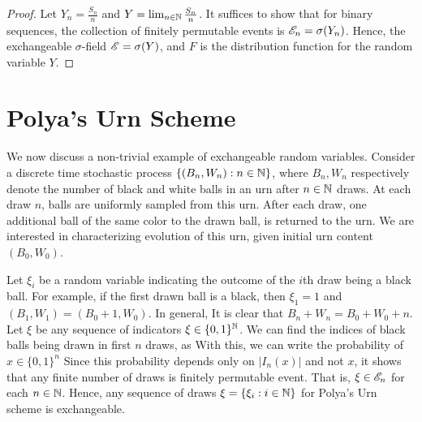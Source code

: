 \documentclass[a4paper,english,10pt]{article}
\begin{document}
\begin{proof}
Let $Y_n = \frac{S_n}{n}$ and $Y = \lim_{n \in \mathbb{N}}\frac{S_n}{n}$. 
It suffices to show that for binary sequences, 
the collection of finitely permutable events is $\mathscr{E}_n = \sigma(Y_n)$. 
Hence, the exchangeable $\sigma$-field $\mathscr{E} = \sigma(Y)$, 
and $F$ is the distribution function for the random variable $Y$. 
\end{proof}

\section{Polya's Urn Scheme}
We now discuss a non-trivial example of exchangeable random variables. 
Consider a discrete time stochastic process $\{(B_n,W_n): n \in \mathbb{N}\}$, 
where $B_n, W_n$ respectively denote the number of black and white balls in an urn after $n \in \mathbb{N}$ draws. 
At each draw $n$, balls are uniformly sampled from this urn. 
After each draw, one additional ball of the same color to the drawn ball, is returned to the urn. 
We are interested in characterizing evolution of this urn, given initial urn content $(B_0,W_0)$.  

Let $\xi_i$ be a random variable indicating the outcome of the $i$th draw being a black ball. 
For example, if the first drawn ball is a black, then $\xi_1 = 1$ and $(B_1,W_1) = (B_0+1, W_0)$. 
In general, 
It is clear that $B_n+W_n = B_0+W_0+n$. 
Let $\xi$ be any sequence of indicators $\xi \in \{0,1\}^{\mathbb{N}}$. 
We can find the indices of black balls being drawn in first $n$ draws, as 
With this, we can write the probability of $x \in \{0,1\}^n$
Since this probability depends only on $|I_n(x)|$ and not $x$, 
it shows that any finite number of draws is finitely permutable event.  
That is, $\xi \in \mathscr{E}_n$ for each $n \in \mathbb{N}$. 
Hence, any sequence of draws $\xi = \{\xi_i: i \in \mathbb{N}\}$ for Polya's Urn scheme is  exchangeable. 
\end{document}
